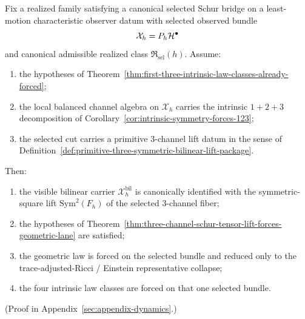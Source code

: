 \begin{theorem}
\label{thm:primitive-three-symmetric-bilinear-lift-forces-schur-tensor-lift}
Fix a realized family satisfying a canonical selected Schur bridge on a
least-motion characteristic observer datum with selected observed bundle
\[
\mathcal X_h=P_h\mathcal{H}^\bullet
\]
and canonical admissible realized class \(\mathfrak R_{\mathrm{sel}}(h)\).
Assume:
\begin{enumerate}[label=(\roman*), leftmargin=2em, itemsep=0.2em]
\item the hypotheses of
      Theorem~\ref{thm:first-three-intrinsic-law-classes-already-forced};
\item the local balanced channel algebra on \(\mathcal X_h\) carries the
      intrinsic \(1+2+3\) decomposition of
      Corollary~\ref{cor:intrinsic-symmetry-forces-123};
\item the selected cut carries a primitive \(3\)-channel lift
      datum in the sense of
      Definition~\ref{def:primitive-three-symmetric-bilinear-lift-package}.
\end{enumerate}
Then:
\begin{enumerate}[label=(\alph*), leftmargin=2em, itemsep=0.2em]
\item the visible bilinear carrier \(\mathcal X_h^{\mathrm{bil}}\) is
      canonically identified with the symmetric-square lift
      \(\mathrm{Sym}^2(F_h)\) of the selected \(3\)-channel fiber;
\item the hypotheses of
      Theorem~\ref{thm:three-channel-schur-tensor-lift-forces-geometric-lane}
      are satisfied;
\item the geometric law is forced on the selected bundle and reduced only to
      the trace-adjusted-Ricci / Einstein representative collapse;
\item the four intrinsic law classes are forced on that one selected
      bundle.
\end{enumerate}
\end{theorem}

(Proof in Appendix~\ref{sec:appendix-dynamics}.)


